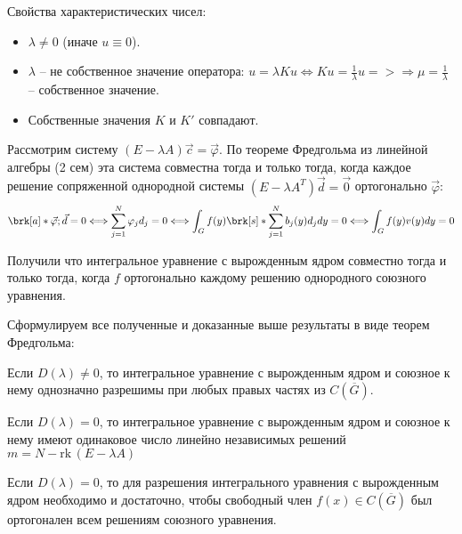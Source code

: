 Свойства характеристических чисел:
\begin{itemize}
  \item $\lambda \neq 0$ (иначе $u \equiv 0$).
  \item $\lambda$ -- не собственное значение оператора: $u = \lambda K u \Leftrightarrow Ku = \frac{1}{\lambda}u => \Rightarrow \mu = \frac{1}{\lambda}$ -- собственное значение.
  \item Собственные значения $K$ и $K'$ совпадают.
\end{itemize}

Рассмотрим систему $(E - \lambda A)\vec{c} = \vec{\varphi}$.
По теореме Фредгольма из линейной алгебры (2 сем) эта система совместна тогда и только тогда, когда каждое решение сопряженной однородной системы $(E - \lambda A^{T})\vec{d} = \vec{0}$ ортогонально $\vec{\varphi}$:
$$\brk[a]*{\vec{\varphi}; \vec{d}} = 0 \Longleftrightarrow \sum_{j=1}^{N}\varphi_{j}d_{j} = 0 \Longleftrightarrow \int_{G}f(y)\brk[s]*{\sum_{j = 1}^{N}b_{j}(y)d_{j}}dy = 0 \Longleftrightarrow \int_{G}f(y)v(y)dy = 0$$

Получили что интегральное уравнение с вырожденным ядром совместно тогда и только тогда, когда $f$ ортогонально каждому решению однородного союзного уравнения.

Сформулируем все полученные и доказанные выше результаты в виде теорем Фредгольма:

\begin{theorem}
  Если $D(\lambda) \neq 0$, то интегральное уравнение с вырожденным ядром и союзное к нему однозначно разрешимы при любых правых частях из $C(\overline{G})$.
\end{theorem}
\begin{theorem}
   Если $D(\lambda) = 0$, то интегральное уравнение с вырожденным ядром и союзное к нему имеют одинаковое число линейно независимых решений $m = N - \mathrm{rk}\,(E - \lambda A)$
\end{theorem}
\begin{theorem}
  Если $D(\lambda) = 0$, то для разрешения интегрального уравнения с вырожденным ядром необходимо и достаточно, чтобы свободный член $f(x) \in C(\overline{G})$ был ортогонален всем решениям союзного уравнения.
\end{theorem}